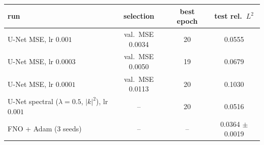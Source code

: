 \begin{tabular}{lccc}
\toprule
run & selection & best epoch & test rel.\ $L^2$ \\
\midrule
U-Net MSE, lr $0.001$ & val.\ MSE 0.0034 & 20 & 0.0555 \\
U-Net MSE, lr $0.0003$ & val.\ MSE 0.0050 & 19 & 0.0679 \\
U-Net MSE, lr $0.0001$ & val.\ MSE 0.0113 & 20 & 0.1030 \\
U-Net spectral ($\lambda{=}0.5$, $|k|^2$), lr $0.001$ & -- & 20 & 0.0516 \\
FNO + Adam (3 seeds) & -- & -- & 0.0364 $\pm$ 0.0019 \\
\bottomrule
\end{tabular}